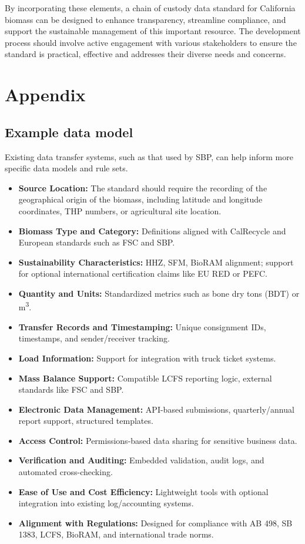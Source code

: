 \documentclass{article}
\begin{document}
By incorporating these elements, a chain of custody data standard for California biomass can be designed to enhance transparency, streamline compliance, and support the sustainable management of this important resource. The development process should involve active engagement with various stakeholders to ensure the standard is practical, effective and addresses their diverse needs and concerns.




\section{Appendix}


\subsection{Example data model}
Existing data transfer systems, such as that used by SBP, can help inform more specific data models and rule sets. 
\begin{itemize}
    \item \textbf{Source Location:} The standard should require the recording of the geographical origin of the biomass, including latitude and longitude coordinates, THP numbers, or agricultural site location.
    \item \textbf{Biomass Type and Category:} Definitions aligned with CalRecycle and European standards such as FSC and SBP.
    \item \textbf{Sustainability Characteristics:} HHZ, SFM, BioRAM alignment; support for optional international certification claims like EU RED or PEFC.
    \item \textbf{Quantity and Units:} Standardized metrics such as bone dry tons (BDT) or m\textsuperscript{3}.
    \item \textbf{Transfer Records and Timestamping:} Unique consignment IDs, timestamps, and sender/receiver tracking.
    \item \textbf{Load Information:} Support for integration with truck ticket systems.
    \item \textbf{Mass Balance Support:} Compatible LCFS reporting logic, external standards like FSC and SBP.
    \item \textbf{Electronic Data Management:} API-based submissions, quarterly/annual report support, structured templates.
    \item \textbf{Access Control:} Permissions-based data sharing for sensitive business data.
    \item \textbf{Verification and Auditing:} Embedded validation, audit logs, and automated cross-checking.
    \item \textbf{Ease of Use and Cost Efficiency:} Lightweight tools with optional integration into existing log/accounting systems.
    \item \textbf{Alignment with Regulations:} Designed for compliance with AB 498, SB 1383, LCFS, BioRAM, and international trade norms.
\end{itemize}
\end{document}
